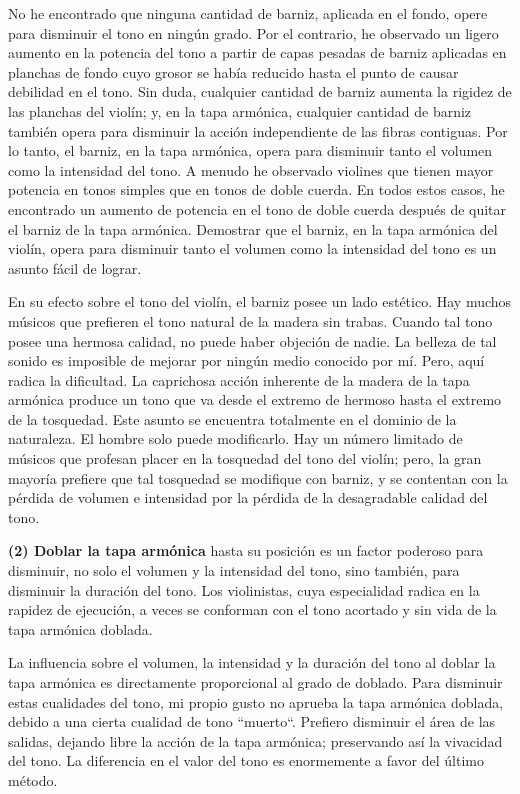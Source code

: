 \documentclass[12pt]{book}
\begin{document}
No he encontrado que ninguna cantidad de barniz, aplicada en el fondo, opere para disminuir el tono en ningún grado. Por el contrario, he observado un ligero aumento en la potencia del tono a partir de capas pesadas de barniz aplicadas en planchas de fondo cuyo grosor se había reducido hasta el punto de causar debilidad en el tono. Sin duda, cualquier cantidad de barniz aumenta la rigidez de las planchas del violín; y, en la tapa armónica, cualquier cantidad de barniz también opera para disminuir la acción independiente de las fibras contiguas. Por lo tanto, el barniz, en la tapa armónica, opera para disminuir tanto el volumen como la intensidad del tono. A menudo he observado violines que tienen mayor potencia en tonos simples que en tonos de doble cuerda. En todos estos casos, he encontrado un aumento de potencia en el tono de doble cuerda después de quitar el barniz de la tapa armónica. Demostrar que el barniz, en la tapa armónica del violín, opera para disminuir tanto el volumen como la intensidad del tono es un asunto fácil de lograr.

En su efecto sobre el tono del violín, el barniz posee un lado estético. Hay muchos músicos que prefieren el tono natural de la madera sin trabas. Cuando tal tono posee una hermosa calidad, no puede haber objeción de nadie. La belleza de tal sonido es imposible de mejorar por ningún medio conocido por mí. Pero, aquí radica la dificultad. La caprichosa acción inherente de la madera de la tapa armónica produce un tono que va desde el extremo de hermoso hasta el extremo de la tosquedad. Este asunto se encuentra totalmente en el dominio de la naturaleza. El hombre solo puede modificarlo. Hay un número limitado de músicos que profesan placer en la tosquedad del tono del violín; pero, la gran mayoría prefiere que tal tosquedad se modifique con barniz, y se contentan con la pérdida de volumen e intensidad por la pérdida de la desagradable calidad del tono.

\textbf{(2) Doblar la tapa armónica} hasta su posición es un factor poderoso para disminuir, no solo el volumen y la intensidad del tono, sino también, para disminuir la duración del tono. Los violinistas, cuya especialidad radica en la rapidez de ejecución, a veces se conforman con el tono acortado y sin vida de la tapa armónica doblada.

La influencia sobre el volumen, la intensidad y la duración del tono al doblar la tapa armónica es directamente proporcional al grado de doblado. Para disminuir estas cualidades del tono, mi propio gusto no aprueba la tapa armónica doblada, debido a una cierta cualidad de tono ``muerto``. Prefiero disminuir el área de las salidas, dejando libre la acción de la tapa armónica; preservando así la vivacidad del tono. La diferencia en el valor del tono es enormemente a favor del último método.
\end{document}
